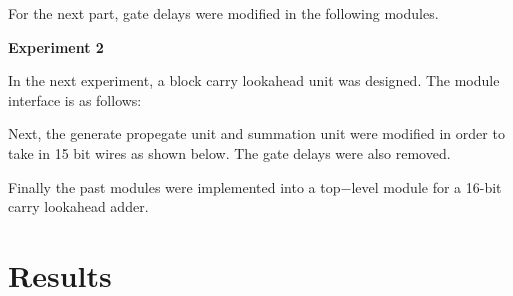 \documentclass[a4paper,12pt]{article}
\begin{document}
  
  
  For the next part, gate delays were modified in the following modules.
  
  

  
  
  

  \hspace{-15pt}\textbf{Experiment 2}
  
  In the next experiment, a block carry lookahead unit was designed. The module interface is as follows:

  
  
  Next, the generate propegate unit and summation unit were modified in order to take in 15 bit wires as shown below. The gate delays were also removed.
  
  
  
  
  
  Finally the past modules were implemented into a top−level module for a 16-bit carry lookahead adder.
  
  
  
\section*{Results}

\end{document}
